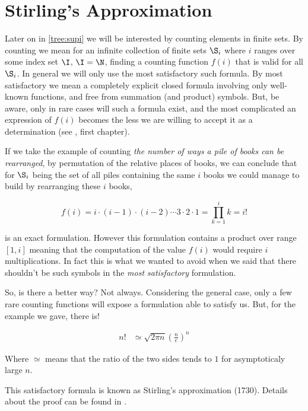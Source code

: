 \section{Stirling's Approximation}
\label{tree:sorting:stirling}

Later on in \ref{tree:supi} we will be interested by counting elements in
finite sets. By counting we mean for an infinite collection of finite sets
$\S_i$ where $i$ ranges over some index set $\I$, \eg $\I = \N$, finding a
counting function $f(i)$ that is valid for all $\S_i$. In general we will only
use the most satisfactory such formula. By most satisfactory we mean a
completely explicit closed formula involving only well-known functions, and
free from summation (and product) symbols. But, be aware, only in rare cases
will such a formula exist, and the most complicated an expression of $f(i)$
becomes the less we are willing to accept it as a determination
(see \citet*{Stanley:2011:ECV:2124415}, first chapter).

If we take the example of counting \emph{the number of ways a pile of books can
be rearranged}, \ie by permutation of the relative places of books, we can
conclude that for $\S_i$ being the set of all piles containing the same $i$
books we could manage to build by rearranging these $i$ books,

$$ f(i) = i \cdot (i-1) \cdot (i-2) \cdots 3 \cdot 2 \cdot 1 = \prod_{k=1}^i k = i! $$

is an exact formulation. However this formulation contains a product over range
$[1, i]$ meaning that the computation of the value $f(i)$ would require $i$
multiplications. In fact this is what we wanted to avoid when we said that
there shouldn't be such symbols in the \emph{most satisfactory} formulation.

So, is there a better way? Not always. Considering the general case, only a few
rare counting functions will expose a formulation able to satisfy us. But, for
the example we gave, there is!


\begin{theorem}
\label{tree:sorting:theorem/stirling}
\begin{align*}
n! &\simeq \sqrt{2 \pi n} \left(\frac{n}{e}\right)^n
\end{align*}
\end{theorem}


Where $\simeq$ means that the ratio of the two sides tends to $1$ for
asymptoticaly large $n$.

This satisfactory formula is known as Stirling's approximation (1730). Details
about the proof can be found in \citet*{feller1967direct}.

